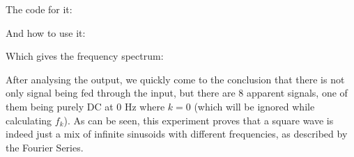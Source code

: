 \newpage
The code for it:


And how to use it:


Which gives the frequency spectrum:

After analysing the output, we quickly come to the conclusion that there is not only signal being fed through the input, but there are 8 apparent signals, one of them being purely DC at 0 Hz where $k = 0$ (which will be ignored while calculating $f_k$). As can be seen, this experiment proves that a square wave is indeed just a mix of infinite sinusoids with different frequencies, as described by the Fourier Series.

\newpage
